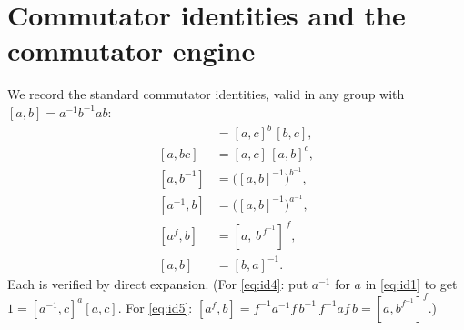 \documentclass{amsart}
\theoremstyle{definition}
\theoremstyle{remark}
\begin{document}
\section{Commutator identities and the commutator engine}\label{sec:engine}

We record the standard commutator identities, valid in any group with
$[a,b]=a^{-1}b^{-1}ab$:
\begin{align}
[ab,c]&=[a,c]^{b}\,[b,c], \label{eq:id1}\\
[a,bc]&=[a,c]\,[a,b]^{c}, \label{eq:id2}\\
[a,b^{-1}]&=\big([a,b]^{-1}\big)^{b^{-1}}, \label{eq:id3}\\
[a^{-1},b]&=\big([a,b]^{-1}\big)^{a^{-1}}, \label{eq:id4}\\
[a^{f},b]&=[a,\,b^{\,f^{-1}}]^{\,f}, \label{eq:id5}\\
[a,b]&=[b,a]^{-1}. \label{eq:id6}
\end{align}
Each is verified by direct expansion. (For \eqref{eq:id4}: put $a^{-1}$ for $a$ in
\eqref{eq:id1} to get $1=[a^{-1},c]^{a}[a,c]$. For \eqref{eq:id5}:
$[a^f,b]=f^{-1}a^{-1}f\,b^{-1}\,f^{-1}af\,b=[a,b^{f^{-1}}]^{f}$.)
\end{document}
